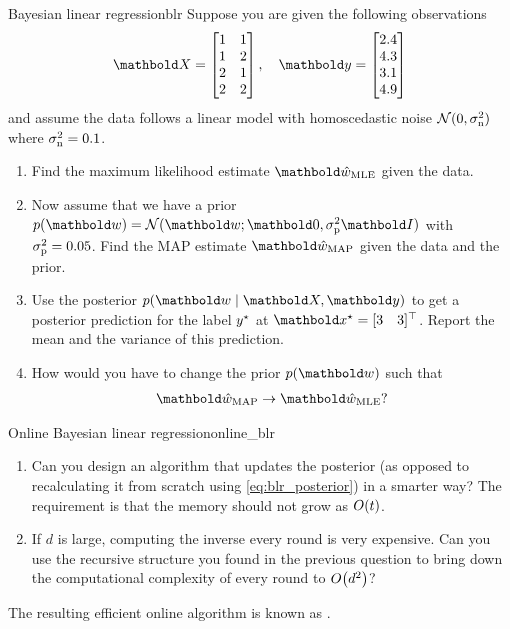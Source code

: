 \begin{nexercise}{Bayesian linear regression}{blr}
  Suppose you are given the following observations \begin{align*}
    \mX = \begin{bmatrix}
      1 & 1 \\
      1 & 2 \\
      2 & 1 \\
      2 & 2 \\
    \end{bmatrix}, \quad \vy = \begin{bmatrix}
      2.4 \\
      4.3 \\
      3.1 \\
      4.9 \\
    \end{bmatrix}
  \end{align*} and assume the data follows a linear model with homoscedastic noise $\N{0}{\sigman^2}$ where $\sigma_{\mathrm{n}}^2 = 0.1$.

  \begin{enumerate}
    \item Find the maximum likelihood estimate $\vwhat_\MLE$ given the data.
    \item Now assume that we have a prior $p(\vw) = \N[\vw]{\vzero}{\sigmap^2 \mI}$ with ${\sigma_{\mathrm{p}}^2 = 0.05}$.
    Find the MAP estimate $\vwhat_\MAP$ given the data and the prior.
    \item Use the posterior $p(\vw \mid \mX, \vy)$ to get a posterior prediction for the label $y^\star$ at $\vxs = \transpose{[3 \quad 3]}$.
    Report the mean and the variance of this prediction.
    \item How would you have to change the prior $p(\vw)$ such that \begin{align*}
      \vwhat_\MAP \to \vwhat_\MLE?
    \end{align*}
  \end{enumerate}
\end{nexercise}

\begin{nexercise}{Online Bayesian linear regression}{online_blr}
  \begin{enumerate}
    \item Can you design an algorithm that updates the posterior (as opposed to recalculating it from scratch using \cref{eq:blr_posterior}) in a smarter way?
    The requirement is that the memory should not grow as $\BigO{t}$.
    \item If $d$ is large, computing the inverse every round is very expensive.
    Can you use the recursive structure you found in the previous question to bring down the computational complexity of every round to $\BigO{d^2}$?\par
  \end{enumerate} The resulting efficient online algorithm is known as .
\end{nexercise}

